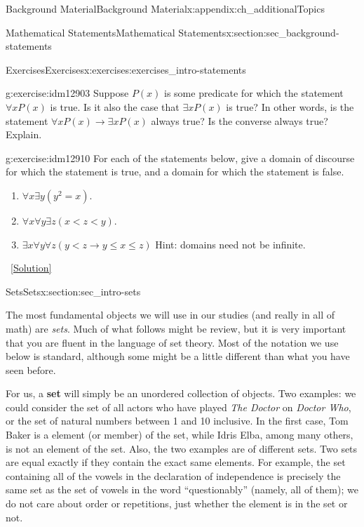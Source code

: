 \documentclass[oneside,10pt,]{book}
\newcommand{\terminology}[1]{\textbf{#1}}
\numberwithin{equation}{chapter}
\def\imp{\rightarrow}
\newcommand{\lt}{<}
\begin{document}
\begin{appendixptx}{Background Material}{}{Background Material}{}{}{x:appendix:ch_additionalTopics}
\begin{sectionptx}{Mathematical Statements}{}{Mathematical Statements}{}{}{x:section:sec_background-statements}
\begin{exercises-subsection}{Exercises}{}{Exercises}{}{}{x:exercises:exercises_intro-statements}
\begin{divisionexercise}{9}{}{}{g:exercise:idm12903}
Suppose \(P(x)\) is some predicate for which the statement \(\forall x P(x)\) is true. Is it also the case that \(\exists x P(x)\) is true? In other words, is the statement \(\forall x P(x) \imp \exists x P(x)\) always true? Is the converse always true? Explain.%
\end{divisionexercise}%
\begin{divisionexercise}{10}{}{}{g:exercise:idm12910}%
For each of the statements below, give a domain of discourse for which the statement is true, and a domain for which the statement is false.%
\par
%
\begin{enumerate}[label=(\alph*)]
\item{}\(\forall x \exists y (y^2 = x)\).%
\item{}\(\forall x \forall y \exists z (x \lt  z \lt  y)\).%
\item{}\(\exists x \forall y \forall z (y \lt  z \imp y \le x \le z)\) Hint: domains need not be infinite.%
\end{enumerate}
%
\qquad~\hfill{\tiny\hyperlink{g:solution:idm12921-main}{[Solution]}}\end{divisionexercise}%
\end{exercises-subsection}
\end{sectionptx}
%
%
\typeout{************************************************}
\typeout{************************************************}
%
\begin{sectionptx}{Sets}{}{Sets}{}{}{x:section:sec_intro-sets}
\begin{introduction}{}%
The most fundamental objects we will use in our studies (and really in all of math) are \emph{sets}. Much of what follows might be review, but it is very important that you are fluent in the language of set theory. Most of the notation we use below is standard, although some might be a little different than what you have seen before.%
\par
For us, a \terminology{set}  will simply be an unordered collection of objects. Two examples: we could consider the set of all actors who have played \emph{The Doctor} on \emph{Doctor Who}, or the set of natural numbers between 1 and 10 inclusive. In the first case, Tom Baker is a element (or member) of the set, while Idris Elba, among many others, is not an element of the set. Also, the two examples are of different sets. Two sets are equal exactly if they contain the exact same elements. For example, the set containing all of the vowels in the declaration of independence is precisely the same set as the set of vowels in the word ``questionably'' (namely, all of them); we do not care about order or repetitions, just whether the element is in the set or not.%

\end{introduction}
\end{sectionptx}
\end{appendixptx}
\end{document}
